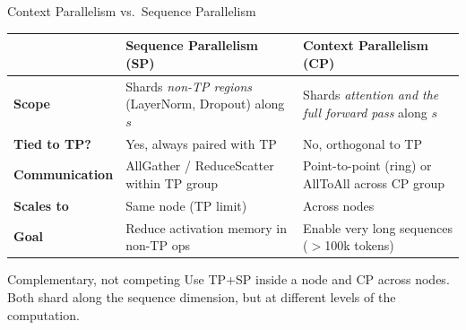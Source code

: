 \begin{frame}{Context Parallelism vs.\ Sequence Parallelism}

  \vspace{0.3em}
  \begin{center}
  {\small
  \begin{tabular}{l p{4.5cm} p{4.5cm}}
    \toprule
    & \textbf{Sequence Parallelism (SP)} & \textbf{Context Parallelism (CP)} \\
    \midrule
    \textbf{Scope} & Shards \emph{non-TP regions} (LayerNorm, Dropout) along $s$ & Shards \emph{attention and the full forward pass} along $s$ \\
    \textbf{Tied to TP?} & Yes, always paired with TP & No, orthogonal to TP \\
    \textbf{Communication} & AllGather / ReduceScatter within TP group & Point-to-point (ring) or AllToAll across CP group \\
    \textbf{Scales to} & Same node (TP limit) & Across nodes \\
    \textbf{Goal} & Reduce activation memory in non-TP ops & Enable very long sequences ($>$100k tokens) \\
    \bottomrule
  \end{tabular}}
  \end{center}

  \vspace{0.5em}
  \begin{alertblock}{Complementary, not competing}
    Use TP+SP inside a node and CP across nodes.  Both shard along the sequence dimension, but at different levels of the computation.
  \end{alertblock}
\end{frame}
